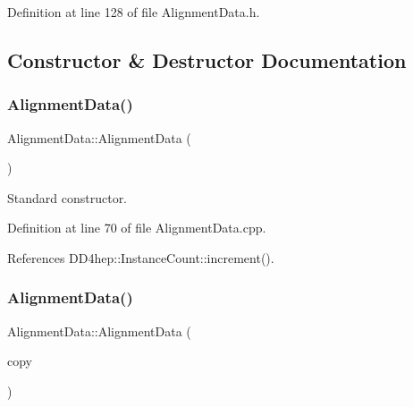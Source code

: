 Definition at line 128 of file Alignment\+Data.\+h.



\subsection{Constructor \& Destructor Documentation}
\hypertarget{class_d_d4hep_1_1_alignments_1_1_alignment_data_a0147080f238040fbab7467bb22ade3dc}{}\label{class_d_d4hep_1_1_alignments_1_1_alignment_data_a0147080f238040fbab7467bb22ade3dc} 
\subsubsection{\texorpdfstring{Alignment\+Data()}{AlignmentData()}\hspace{0.1cm}{\footnotesize\ttfamily [1/2]}}
{\footnotesize\ttfamily Alignment\+Data\+::\+Alignment\+Data (\begin{DoxyParamCaption}{ }\end{DoxyParamCaption})}



Standard constructor. 



Definition at line 70 of file Alignment\+Data.\+cpp.



References D\+D4hep\+::\+Instance\+Count\+::increment().

\hypertarget{class_d_d4hep_1_1_alignments_1_1_alignment_data_a5bb5d24d5baeef53da5feac655612362}{}\label{class_d_d4hep_1_1_alignments_1_1_alignment_data_a5bb5d24d5baeef53da5feac655612362} 
\subsubsection{\texorpdfstring{Alignment\+Data()}{AlignmentData()}\hspace{0.1cm}{\footnotesize\ttfamily [2/2]}}
{\footnotesize\ttfamily Alignment\+Data\+::\+Alignment\+Data (\begin{DoxyParamCaption}\item[{const \hyperlink{class_d_d4hep_1_1_alignments_1_1_alignment_data}{Alignment\+Data} \&}]{copy }\end{DoxyParamCaption})}



